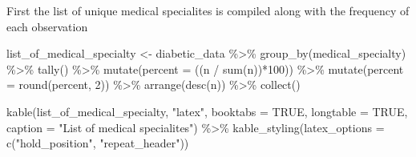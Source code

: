\documentclass[
]{article}
\newenvironment{Shaded}{\begin{snugshade}}{\end{snugshade}}
\newcommand{\AttributeTok}[1]{\textcolor[rgb]{0.77,0.63,0.00}{#1}}
\newcommand{\ConstantTok}[1]{\textcolor[rgb]{0.00,0.00,0.00}{#1}}
\newcommand{\DecValTok}[1]{\textcolor[rgb]{0.00,0.00,0.81}{#1}}
\newcommand{\FunctionTok}[1]{\textcolor[rgb]{0.00,0.00,0.00}{#1}}
\newcommand{\NormalTok}[1]{#1}
\newcommand{\OtherTok}[1]{\textcolor[rgb]{0.56,0.35,0.01}{#1}}
\newcommand{\SpecialCharTok}[1]{\textcolor[rgb]{0.00,0.00,0.00}{#1}}
\newcommand{\StringTok}[1]{\textcolor[rgb]{0.31,0.60,0.02}{#1}}
\begin{document}
First the list of unique medical specialites is compiled along with the
frequency of each observation

\begin{Shaded}
\begin{Highlighting}[]
\NormalTok{list\_of\_medical\_specialty }\OtherTok{\textless{}{-}}\NormalTok{ diabetic\_data }\SpecialCharTok{\%\textgreater{}\%}
  \FunctionTok{group\_by}\NormalTok{(medical\_specialty) }\SpecialCharTok{\%\textgreater{}\%}
  \FunctionTok{tally}\NormalTok{() }\SpecialCharTok{\%\textgreater{}\%}
  \FunctionTok{mutate}\NormalTok{(}\AttributeTok{percent =}\NormalTok{ ((n }\SpecialCharTok{/} \FunctionTok{sum}\NormalTok{(n))}\SpecialCharTok{*}\DecValTok{100}\NormalTok{)) }\SpecialCharTok{\%\textgreater{}\%}
  \FunctionTok{mutate}\NormalTok{(}\AttributeTok{percent =} \FunctionTok{round}\NormalTok{(percent, }\DecValTok{2}\NormalTok{)) }\SpecialCharTok{\%\textgreater{}\%}
  \FunctionTok{arrange}\NormalTok{(}\FunctionTok{desc}\NormalTok{(n)) }\SpecialCharTok{\%\textgreater{}\%}
  \FunctionTok{collect}\NormalTok{()}

\FunctionTok{kable}\NormalTok{(list\_of\_medical\_specialty,}
      \StringTok{"latex"}\NormalTok{, }\AttributeTok{booktabs =} \ConstantTok{TRUE}\NormalTok{, }\AttributeTok{longtable =} \ConstantTok{TRUE}\NormalTok{, }\AttributeTok{caption =} \StringTok{"List of medical specialites"}\NormalTok{) }\SpecialCharTok{\%\textgreater{}\%}
  \FunctionTok{kable\_styling}\NormalTok{(}\AttributeTok{latex\_options =} \FunctionTok{c}\NormalTok{(}\StringTok{"hold\_position"}\NormalTok{, }\StringTok{"repeat\_header"}\NormalTok{))}
\end{Highlighting}
\end{Shaded}
\end{document}
